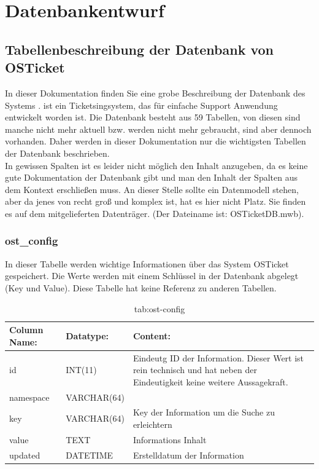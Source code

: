 \newpage
\renewcommand{\arraystretch}{1.5}
\newcommand{\code}{\texttt}
\section{Datenbankentwurf}
\def \currentAuthor{Elias Gabl}

\subsection{Tabellenbeschreibung der Datenbank von OSTicket}

In dieser Dokumentation finden Sie eine grobe Beschreibung der Datenbank des Systems \getOst. \getOst ist ein Ticketsingsystem, das für einfache Support Anwendung entwickelt worden ist. Die Datenbank besteht aus 59 Tabellen, von diesen sind manche nicht mehr aktuell bzw. werden nicht mehr gebraucht, sind aber dennoch vorhanden. Daher werden in dieser Dokumentation nur die wichtigsten Tabellen der Datenbank beschrieben.\\
In gewissen Spalten ist es leider nicht möglich den Inhalt anzugeben, da es keine gute Dokumentation der Datenbank gibt und man den Inhalt der Spalten aus dem Kontext erschließen muss.
\newline
\newline
An dieser Stelle sollte ein Datenmodell stehen, aber da jenes von \getOst recht groß und komplex ist, hat es hier nicht Platz. Sie finden es auf dem mitgelieferten Datenträger. (Der Dateiname ist: OSTicketDB.mwb).


\newpage

\subsubsection{ost\_config}

In dieser Tabelle werden wichtige Informationen über das System OSTicket gespeichert. Die Werte werden mit einem Schlüssel in der Datenbank abgelegt (Key und Value).
Diese Tabelle hat keine Referenz zu anderen Tabellen.

\begin{table}[h]
	\begin{tabular}{|p{3.5cm}|p{4cm}|p{6.2cm}|}
		\hline
		\textbf{Column Name:} & \textbf{Datatype:} & \textbf{Content:}\\
		\hline
		id & INT(11) & Eindeutg ID der Information. Dieser Wert ist rein technisch und hat neben der Eindeutigkeit keine weitere 
		Aussagekraft. \\
		\hline
		namespace & VARCHAR(64) & \\
		\hline
		key & VARCHAR(64) & Key der Information um die Suche zu erleichtern\\
		\hline
		value & TEXT & Informations Inhalt\\
		\hline
		updated & DATETIME & Erstelldatum der Information\\
		\hline
	\end{tabular}
	\caption{tab:ost-config}
\end{table}
\label{tab:ost_config}
\newpage



